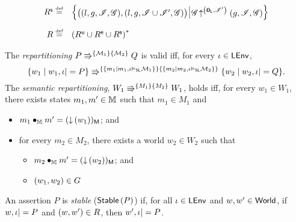 \begin{definition}[Rely]
\[\begin{array}{r l}
	
	\shiftR \eqdef & 
	\left\{
  \begin{array}{@{} l @{\hspace*{2pt}} | @{\hspace*{2pt}} r @{}}
    \left(
    \begin{array}{@{} l @{}}
      (l, g, \lmod, \gmod),
      \left( l, g, \lmod \cup \lmod', \gmod \right)
    \end{array}
    \right)
    &
    \expandsAM{\gmod}{\unitL}{\lmod'}{g}{\lmod}{\gmod}
  \end{array}
  \right\}\\\\
	
	\rely \eqdef & \left(\updateR \cup \extendR \cup \shiftR \right)^{*}
\end{array}
\]
%
\end{definition}
%
%
\begin{definition}[Repartitioning]The \emph{repartitioning} 
$\repartitions{P}{Q}{\heapAss{1}}{\heapAss{2}}$ is valid iff, for
every $\lenv \in \LEnv$, 
\[
	\repartitions{\{w_1 \mid w_1, \lenv |= P\} }{\{w_2 \mid w_2, \lenv |=  Q \}}{\{m_1 \mid m_1, \lenv \slsat \heapAss{1} \}}{\{m_2 \mid m_2, \lenv \slsat \heapAss{2} \}}.
\]
% 
The \emph{semantic repartitioning}, $\repartitions{W_1}{W_1}{M_1}{M_2}$, holds iff, for every $w_1  \in W_1$, there exists states $m_1, m' \in \Heaps$ such that $m_1 \in M_1$ and
\begin{itemize}
	\item $m_1 \composeH m' = \heapPart{(\collapseW{w_1})}$; and
	\item for every $m_2 \in M_{2}$, there exists a world $w_2 \in W_2$ such that
	\begin{itemize}
		\item $m_2 \composeH m' = \heapPart{(\collapseW{w_2})}$; and
		\item $(w_1, w_2) \in \guarantee$
	\end{itemize}
\end{itemize}
%

%
%
\end{definition}
%
%
\begin{definition}[Stability] An assertion $P$ is \emph{stable} ($\stable{P}$) if, for all $\lenv
  \in \LEnv$ and $w, w' \in \Worlds$, if $w, \lenv |= P$ and $(w, w')
  \in \rely$, then $w', \lenv |= P$.
\end{definition}
%

